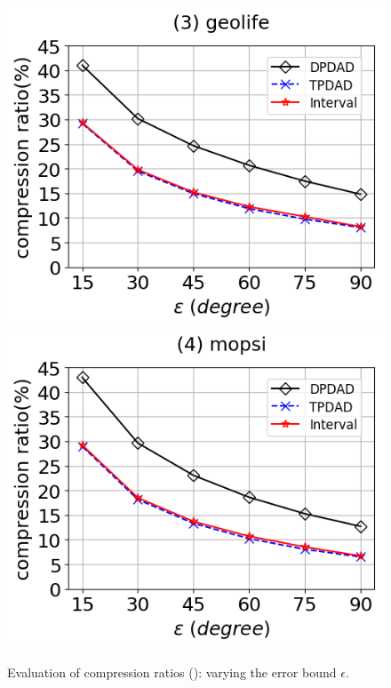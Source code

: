 \begin{figure}[tb!]
	\includegraphics[scale=0.315]{Figures/Exp-DAD-CR-epsilon-geolife.png}	\hspace{1ex}
	\includegraphics[scale=0.315]{Figures/Exp-DAD-CR-epsilon-mopsi.png}		
	\vspace{-3ex}
	\caption{\small Evaluation of compression ratios (\dad): varying the error bound $\epsilon$.}
	\label{fig:cr-dad-epsilon}
	\vspace{-2ex}
\end{figure}

